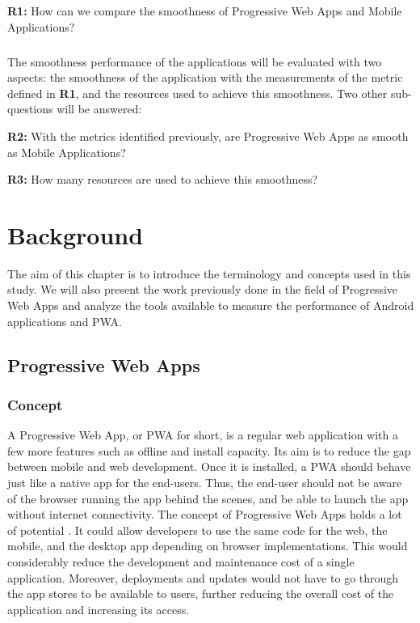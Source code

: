 \documentclass{kththesis}
\begin{document}
\textbf{R1:} How can we compare the smoothness of Progressive Web Apps and Mobile Applications?

\paragraph{}
The smoothness performance of the applications will be evaluated with two aspects: the smoothness of the application with the measurements of the metric defined in \textbf{R1}, and the resources used to achieve this smoothness. Two other sub-questions will be answered: \newline

\textbf{R2:} With the metrics identified previously, are Progressive Web Apps as smooth as Mobile Applications? \newline

\medskip

\textbf{R3:} How many resources are used to achieve this smoothness?


\chapter{Background}

The aim of this chapter is to introduce the terminology and concepts used in this study. We will also present the work previously done in the field of Progressive Web Apps and analyze the tools available to measure the performance of Android applications and PWA.


\section{Progressive Web Apps}

\subsection{Concept}

A Progressive Web App, or PWA for short, is a regular web application with a few more features such as offline and install capacity. Its aim is to reduce the gap between mobile and web development. Once it is installed, a PWA should behave just like a native app for the end-users. Thus, the end-user should not be aware of the browser running the app behind the scenes, and be able to launch the app without internet connectivity. \newline
The concept of Progressive Web Apps holds a lot of potential \cite{PWApossibleUnifer}. It could allow developers to use the same code for the web, the mobile, and the desktop app depending on browser implementations. This would considerably reduce the development and maintenance cost of a single application. Moreover, deployments and updates would not have to go through the app stores to be available to users, further reducing the overall cost of the application and increasing its access.
\end{document}
